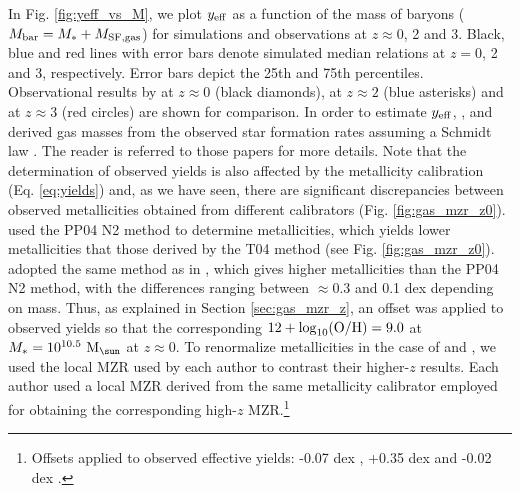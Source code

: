 \documentclass[useAMS,usenatbib]{mn2e}
\begin{document}
In Fig. \ref{fig:yeff_vs_M}, we plot $y_{\rm eff}$ as a function of the mass of baryons
($M_{\rm bar} = M_* + M_{\rm SF, gas}$) for
simulations and observations at $z\approx0$, 2 and 3.
Black, blue and red lines with error bars denote simulated median relations
at $z=0$, 2 and 3, respectively.
Error bars depict the 25th and 75th percentiles.
Observational results by \citet{tremonti2004} at $z\approx0$ (black diamonds),
\citet{erb2006} at $z\approx2$ (blue asterisks)
and \citet{troncoso2014} at $z\approx3$ (red circles) are shown for comparison.
In order to estimate $y_{\rm eff}$, \citet{tremonti2004}, \citet{erb2006} and \citet{troncoso2014} 
derived gas masses from the observed star formation rates assuming a 
Schmidt law \citep{kennicutt1998}.  The reader is referred to those papers
for more details.
Note that the determination of observed yields is also affected by the metallicity calibration 
(Eq. \ref{eq:yields}) and, as we have seen, there are significant discrepancies
between observed metallicities obtained from different calibrators (Fig. \ref{fig:gas_mzr_z0}). 
\citet{erb2006} used the PP04 N2 method to determine metallicities, which yields lower metallicities
that those derived by the T04 method (see Fig. \ref{fig:gas_mzr_z0}).  
\citet{troncoso2014} adopted the same method as in \citet{maiolino2008}, which gives higher
metallicities than the PP04 N2 method, with the differences ranging between $\approx 0.3$ and
0.1 dex depending on mass.
Thus, as explained in Section \ref{sec:gas_mzr_z}, an offset
was applied to observed yields so that the corresponding $12 + {\log}_{10}({\rm O/H}) = 9.0$ at
$M_* = 10^{10.5} \ {\rm M_{\sun}}$ at $z\approx0$.
To renormalize metallicities in the case of \citet{erb2006} and \citet{troncoso2014}, 
we used the local MZR used by each author to contrast their higher-$z$ results.
Each author used a local MZR derived from the same metallicity calibrator employed for
obtaining the corresponding high-$z$ MZR.\footnote{Offsets applied to 
observed effective yields: -0.07 dex \citep{tremonti2004},
+0.35 dex \citep{erb2006} and
-0.02 dex \citep{troncoso2014}.}
\end{document}
